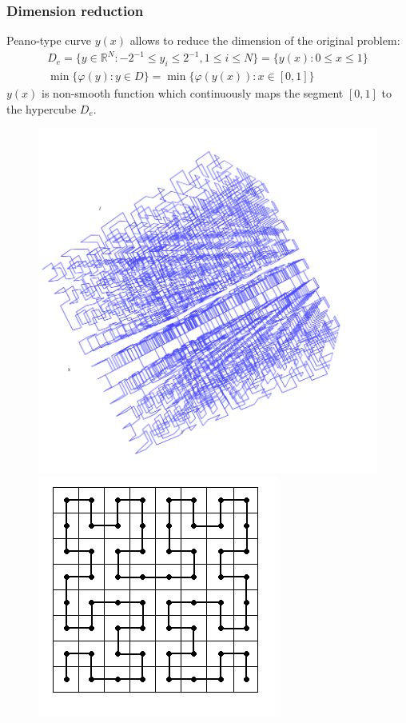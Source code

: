 \documentclass[aspectratio=1610]{beamer}
\begin{document}
\begin{frame}
  \frametitle{Dimension reduction}
  \begin{center}
  Peano-type curve \(y(x)\) allows to reduce the dimension of the original problem:
  \begin{gather}
    D_e=\lbrace y\in \mathbb{R}^N:-2^{-1}\leqslant y_i\leqslant 2^{-1},1\leqslant i\leqslant N\rbrace=\{y(x):0\leqslant x\leqslant 1\} \nonumber \\
    \min\{\varphi(y): y\in D\}=\min\{\varphi(y(x)): x\in [0,1]\} \nonumber
  \end{gather}
  \(y(x)\) is non-smooth function which continuously maps the segment \([0,1]\) to the hypercube \(D_e\).
  \begin{figure}[ht]
    \includegraphics[width=.35\textwidth]{peano3d.png}
    \includegraphics[width=.35\textwidth]{peano2d.png}
  \end{figure}
\end{center}
\end{frame}
\end{document}
